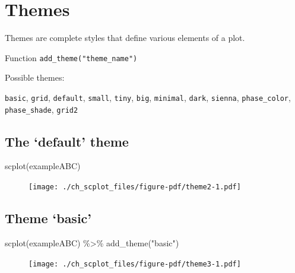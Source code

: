 \documentclass[
  letterpaper,
  DIV=11,
  numbers=noendperiod]{scrreprt}
\newenvironment{Shaded}{\begin{snugshade}}{\end{snugshade}}
\newcommand{\FunctionTok}[1]{\textcolor[rgb]{0.28,0.35,0.67}{#1}}
\newcommand{\NormalTok}[1]{\textcolor[rgb]{0.00,0.23,0.31}{#1}}
\newcommand{\SpecialCharTok}[1]{\textcolor[rgb]{0.37,0.37,0.37}{#1}}
\newcommand{\StringTok}[1]{\textcolor[rgb]{0.13,0.47,0.30}{#1}}
\begin{document}
\hypertarget{themes}{%
\section{Themes}\label{themes}}

Themes are complete styles that define various elements of a plot.

Function \texttt{add\_theme("theme\_name")}

Possible themes:

\texttt{basic}, \texttt{grid}, \texttt{default}, \texttt{small},
\texttt{tiny}, \texttt{big}, \texttt{minimal}, \texttt{dark},
\texttt{sienna}, \texttt{phase\_color}, \texttt{phase\_shade},
\texttt{grid2}

\hypertarget{the-default-theme}{%
\subsection{The `default' theme}\label{the-default-theme}}

\begin{Shaded}
\begin{Highlighting}[]
\FunctionTok{scplot}\NormalTok{(exampleABC)}
\end{Highlighting}
\end{Shaded}

\begin{figure}[H]

{\centering \texttt{[image: ./ch\_scplot\_files/figure-pdf/theme2-1.pdf]}

}

\end{figure}

\hypertarget{theme-basic}{%
\subsection{Theme `basic'}\label{theme-basic}}

\begin{Shaded}
\begin{Highlighting}[]
\FunctionTok{scplot}\NormalTok{(exampleABC) }\SpecialCharTok{\%\textgreater{}\%}
  \FunctionTok{add\_theme}\NormalTok{(}\StringTok{"basic"}\NormalTok{)}
\end{Highlighting}
\end{Shaded}

\begin{figure}[H]

{\centering \texttt{[image: ./ch\_scplot\_files/figure-pdf/theme3-1.pdf]}

}

\end{figure}
\end{document}

